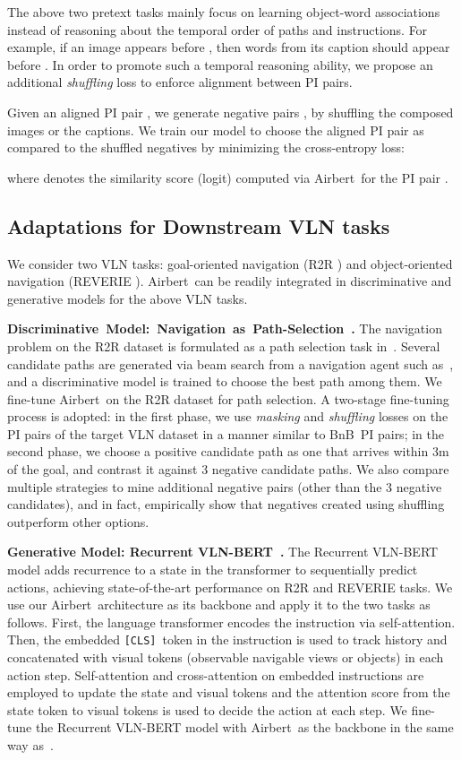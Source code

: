 \RequirePackage[dvipsnames,table]{xcolor} \documentclass[10pt,twocolumn,letterpaper]{article}
\newcommand{\p}[1]{\vspace{1mm}\noindent\textbf{#1}}
\newcommand{\airbert}{Airbert}
\newcommand{\airbnb}{BnB}
\newcommand{\cls}{\texttt{[CLS]}}
\begin{document}
The above two pretext tasks mainly focus on learning object-word associations instead of reasoning about the temporal order of paths and instructions.
For example, if an image  appears before , then words from its caption  should appear before .
In order to promote such a temporal reasoning ability, we propose an additional \emph{shuffling} loss to enforce alignment between PI pairs.

Given an aligned PI pair , we generate  negative pairs , by shuffling the composed images or the captions.
We train our model to choose the aligned PI pair as compared to the shuffled negatives by minimizing the cross-entropy loss:

where  denotes the similarity score (logit) computed via \airbert~for the PI pair .


\subsection{Adaptations for Downstream VLN tasks}
\label{sec:downstream}
We consider two VLN tasks: goal-oriented navigation (R2R \cite{anderson2018r2r}) and object-oriented navigation (REVERIE \cite{qi2020reverie}).
\airbert~can be readily integrated in discriminative and generative models for the above VLN tasks.


\p{\mbox{Discriminative Model: Navigation as Path-Selection~\cite{majumdar2020vlnbert}.}}
The navigation problem on the R2R dataset is formulated as a path selection task in~\cite{majumdar2020vlnbert}.
Several candidate paths are generated via beam search from a navigation agent such as~\cite{tan2019envdrop}, and a discriminative model is trained to choose the best path among them.
We fine-tune \airbert~on the R2R dataset for path selection.
A two-stage fine-tuning process is adopted: 
in the first phase, we use \emph{masking} and \emph{shuffling} losses on the PI pairs of the target VLN dataset in a manner similar to \airbnb~PI pairs;
in the second phase, we choose a positive candidate path as one that arrives within 3m of the goal, and contrast it against 3 negative candidate paths.
We also compare multiple strategies to mine additional negative pairs (other than the 3 negative candidates), and in fact, empirically show that negatives created using shuffling outperform other options.



\p{Generative Model: Recurrent VLN-BERT~\cite{hong2021recurrentvln}.}
The Recurrent VLN-BERT model adds recurrence to a state in the transformer to sequentially predict actions, achieving state-of-the-art performance on R2R and REVERIE tasks.
We use our \airbert~architecture as its backbone and apply it to the two tasks as follows.
First, the language transformer encodes the instruction via self-attention.
Then, the embedded \cls~token in the instruction is used to track history and concatenated with visual tokens (observable navigable views or objects) in each action step.
Self-attention and cross-attention on embedded instructions are employed to update the state and visual tokens and the attention score from the state token to visual tokens is used to decide the action at each step.
We fine-tune the Recurrent VLN-BERT model with \airbert~as the backbone in the same way as~\cite{hong2021recurrentvln}.
\end{document}
